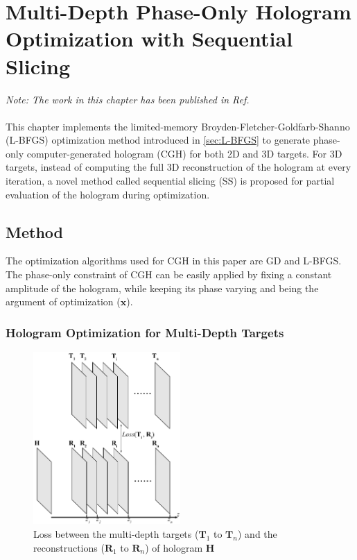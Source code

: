 \chapter{Multi-Depth Phase-Only Hologram Optimization with Sequential Slicing}\label{chapter:Multi-Depth Phase-Only Hologram Optimization}

\graphicspath{{Chapter_Multi_depth_optim/Figs/}}

\textit{Note: The work in this chapter has been published in Ref. \cite{Sha2023}}\\\\

This chapter implements the limited-memory Broyden-Fletcher-Goldfarb-Shanno (L-BFGS) optimization method introduced in \cref{sec:L-BFGS} to generate phase-only computer-generated hologram (CGH) for both 2D and 3D targets. For 3D targets, instead of computing the full 3D reconstruction of the hologram at every iteration, a novel method called sequential slicing (SS) is proposed for partial evaluation of the hologram during optimization.


\section{Method}



The optimization algorithms used for CGH in this paper are GD and L-BFGS. The phase-only constraint of CGH can be easily applied by fixing a constant amplitude of the hologram, while keeping its phase varying and being the argument of optimization ($\textbf{x}$).


\subsection{Hologram Optimization for Multi-Depth Targets}

\begin{figure}[h!]
	\centering
	\includegraphics[width=0.5\textwidth]{Fresnel_slice_illustration}
	\caption{Loss between the multi-depth targets ($\textbf{T}_1$ to $\textbf{T}_n$) and the reconstructions ($\textbf{R}_1$ to $\textbf{R}_n$) of hologram $\textbf{H}$}
	\label{fig:Fresnel_slice_illustration}
\end{figure}

